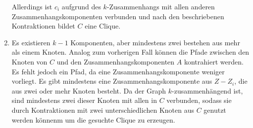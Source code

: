 \begin{beweis}
\begin{enumerate}
          Allerdings ist $c_i$ aufgrund des $k$-Zusammenhangs mit allen anderen Zusammenhangskomponenten verbunden und nach den beschriebenen Kontraktionen bildet $C$ eine Clique.
    \item Es existieren $k-1$ Komponenten, aber mindestens zwei bestehen aus mehr als einem Knoten.
          Analog zum vorherigen Fall können die Pfade zwischen den Knoten von $C$ und den Zusammenhangskomponenten $A$ kontrahiert werden.
          Es fehlt jedoch ein Pfad, da eine Zusammenhangskomponente weniger vorliegt.
          Es gibt mindestens eine Zusammenhangskomponente aus $Z - Z_i$, die aus zwei oder mehr Knoten besteht.
          Da der Graph $k$-zusammenhängend ist, sind mindestens zwei dieser Knoten mit allen in $C$ verbunden, sodass sie durch Kontraktionen mit zwei unterschiedlichen Knoten aus $C$ genutzt werden könnenm um die gesuchte Clique zu erzeugen.
  \end{enumerate}
\end{beweis}

